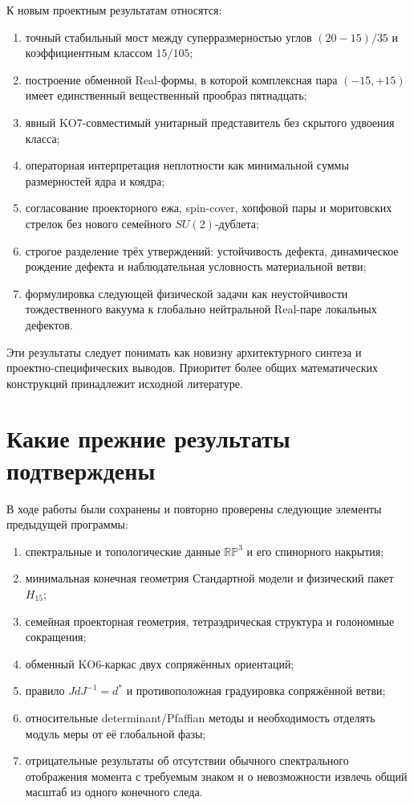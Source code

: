 К новым проектным результатам относятся:
\begin{enumerate}
 \item точный стабильный мост между суперразмерностью углов
 $(20-15)/35$ и коэффициентным классом $15/105$;
 \item построение обменной Real-формы, в которой комплексная пара
 $(-15,+15)$ имеет единственный вещественный прообраз пятнадцать;
 \item явный KO7-совместимый унитарный представитель без скрытого
 удвоения класса;
 \item операторная интерпретация неплотности как минимальной суммы
 размерностей ядра и коядра;
 \item согласование проекторного ежа, spin-cover, хопфовой пары и
 моритовских стрелок без нового семейного $SU(2)$-дублета;
 \item строгое разделение трёх утверждений: устойчивость дефекта,
 динамическое рождение дефекта и наблюдательная условность материальной
 ветви;
 \item формулировка следующей физической задачи как неустойчивости
 тождественного вакуума к глобально нейтральной Real-паре локальных
 дефектов.
\end{enumerate}

Эти результаты следует понимать как новизну архитектурного синтеза и
проектно-специфических выводов. Приоритет более общих математических
конструкций принадлежит исходной литературе.

\section*{Какие прежние результаты подтверждены}

В ходе работы были сохранены и повторно проверены следующие элементы
предыдущей программы:
\begin{enumerate}
 \item спектральные и топологические данные $\mathbb{RP}^3$ и его
 спинорного накрытия;
 \item минимальная конечная геометрия Стандартной модели и физический
 пакет $H_{15}$;
 \item семейная проекторная геометрия, тетраэдрическая структура и
 голономные сокращения;
 \item обменный KO6-каркас двух сопряжённых ориентаций;
 \item правило $JdJ^{-1}=d^*$ и противоположная градуировка сопряжённой
 ветви;
 \item относительные determinant/Pfaffian методы и необходимость
 отделять модуль меры от её глобальной фазы;
 \item отрицательные результаты об отсутствии обычного спектрального
 отображения момента с требуемым знаком и о невозможности извлечь общий
 масштаб из одного конечного следа.
\end{enumerate}

